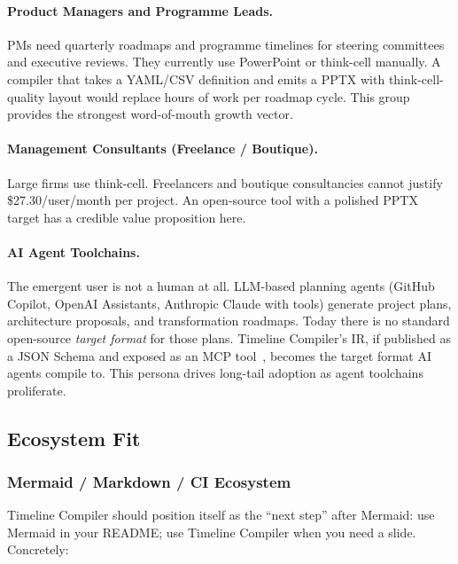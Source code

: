 \paragraph{Product Managers and Programme Leads.}
PMs need quarterly roadmaps and programme timelines for steering committees
and executive reviews.
They currently use PowerPoint or think-cell manually.
A compiler that takes a YAML/CSV definition and emits a PPTX with
think-cell-quality layout would replace hours of work per roadmap cycle.
This group provides the strongest word-of-mouth growth vector.

\paragraph{Management Consultants (Freelance / Boutique).}
Large firms use think-cell.
Freelancers and boutique consultancies cannot justify \$27.30/user/month
per project.
An open-source tool with a polished PPTX target has a credible value
proposition here.

\paragraph{AI Agent Toolchains.}
The emergent user is not a human at all.
LLM-based planning agents (GitHub Copilot, OpenAI Assistants, Anthropic
Claude with tools) generate project plans, architecture proposals, and
transformation roadmaps.
Today there is no standard open-source \emph{target format} for those plans.
Timeline Compiler's IR, if published as a JSON Schema and exposed as an MCP
tool~\cite{mcp-spec}, becomes the target format AI agents compile to.
This persona drives long-tail adoption as agent toolchains proliferate.

\subsection{Ecosystem Fit}
\label{sec:oss-ecosystem}

\subsubsection{Mermaid / Markdown / CI Ecosystem}

Timeline Compiler should position itself as the ``next step'' after Mermaid:
use Mermaid in your README; use Timeline Compiler when you need a slide.
Concretely:

